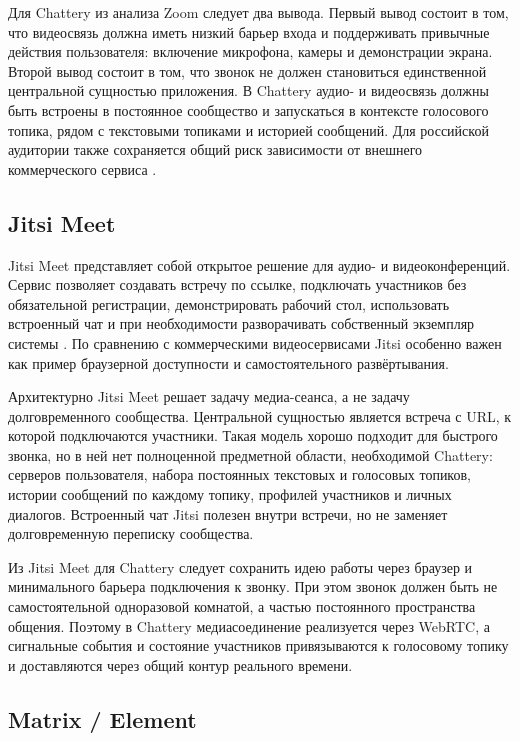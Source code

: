 \documentclass[a4paper,12pt]{extarticle}
\begin{document}
Для Chattery из анализа Zoom следует два вывода. Первый вывод состоит в том, что видеосвязь должна иметь низкий барьер входа и поддерживать привычные действия пользователя: включение микрофона, камеры и демонстрации экрана. Второй вывод состоит в том, что звонок не должен становиться единственной центральной сущностью приложения. В Chattery аудио- и видеосвязь должны быть встроены в постоянное сообщество и запускаться в контексте голосового топика, рядом с текстовыми топиками и историей сообщений. Для российской аудитории также сохраняется общий риск зависимости от внешнего коммерческого сервиса \cite{zoom_russia}.

\subsection{Jitsi Meet}

Jitsi Meet представляет собой открытое решение для аудио- и видеоконференций. Сервис позволяет создавать встречу по ссылке, подключать участников без обязательной регистрации, демонстрировать рабочий стол, использовать встроенный чат и при необходимости разворачивать собственный экземпляр системы \cite{jitsi}. По сравнению с коммерческими видеосервисами Jitsi особенно важен как пример браузерной доступности и самостоятельного развёртывания.

Архитектурно Jitsi Meet решает задачу медиа-сеанса, а не задачу долговременного сообщества. Центральной сущностью является встреча с URL, к которой подключаются участники. Такая модель хорошо подходит для быстрого звонка, но в ней нет полноценной предметной области, необходимой Chattery: серверов пользователя, набора постоянных текстовых и голосовых топиков, истории сообщений по каждому топику, профилей участников и личных диалогов. Встроенный чат Jitsi полезен внутри встречи, но не заменяет долговременную переписку сообщества.

Из Jitsi Meet для Chattery следует сохранить идею работы через браузер и минимального барьера подключения к звонку. При этом звонок должен быть не самостоятельной одноразовой комнатой, а частью постоянного пространства общения. Поэтому в Chattery медиасоединение реализуется через WebRTC, а сигнальные события и состояние участников привязываются к голосовому топику и доставляются через общий контур реального времени.

\subsection{Matrix / Element}
\end{document}
